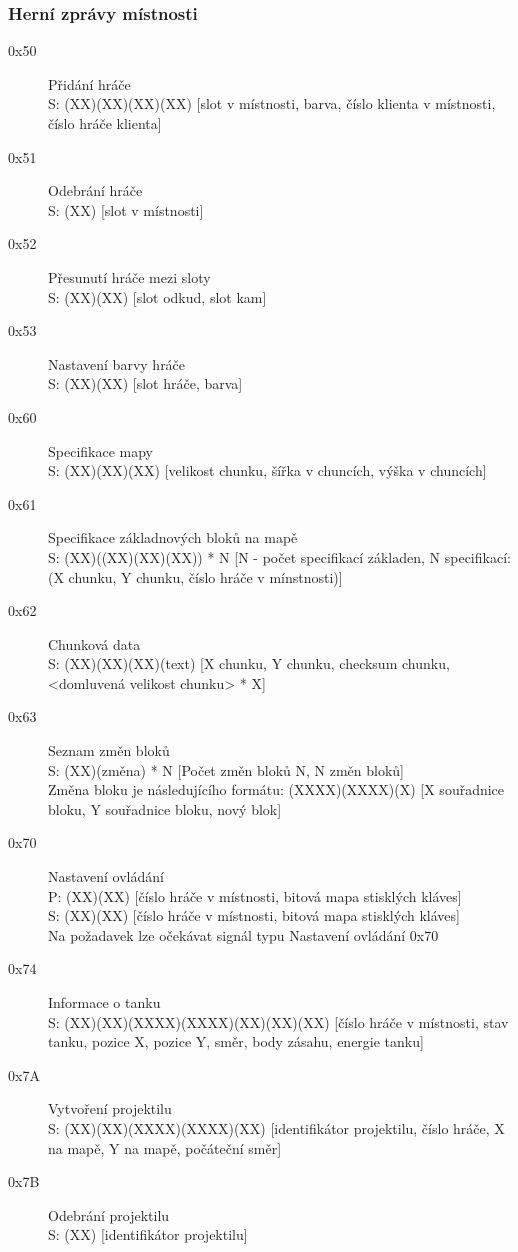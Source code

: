 \documentclass[12pt,a4paper]{article}
\begin{document}
\subsubsection*{Herní zprávy místnosti}
\begin{description}
\item[0x50] Přidání hráče \\
S: (XX)(XX)(XX)(XX) [slot v místnosti, barva, číslo klienta v místnosti, číslo hráče klienta] \\
\item[0x51] Odebrání hráče \\
S: (XX) [slot v místnosti]
\item[0x52] Přesunutí hráče mezi sloty \\
S: (XX)(XX) [slot odkud, slot kam]
\item[0x53] Nastavení barvy hráče \\
S: (XX)(XX) [slot hráče, barva]
\item[0x60] Specifikace mapy \\
S: (XX)(XX)(XX) [velikost chunku, šířka v chuncích, výška v chuncích]
\item[0x61] Specifikace základnových bloků na mapě \\
S: (XX)((XX)(XX)(XX)) * N [N - počet specifikací základen, N specifikací: (X chunku, Y chunku, číslo hráče v mínstnosti)]
\item[0x62] Chunková data \\
S: (XX)(XX)(XX)(text) [X chunku, Y chunku, checksum chunku, <domluvená velikost chunku> * X] \\
\item[0x63] Seznam změn bloků \\
S: (XX)(změna) * N [Počet změn bloků N, N změn bloků]\\ 
Změna bloku je následujícího formátu: (XXXX)(XXXX)(X) [X souřadnice bloku, Y souřadnice bloku, nový blok]
\item[0x70] Nastavení ovládání \\
P: (XX)(XX) [číslo hráče v místnosti, bitová mapa stisklých kláves] \\
S: (XX)(XX) [číslo hráče v místnosti, bitová mapa stisklých kláves] \\
Na požadavek lze očekávat signál typu Nastavení ovládání 0x70
\item[0x74] Informace o tanku \\
S: (XX)(XX)(XXXX)(XXXX)(XX)(XX)(XX) [číslo hráče v místnosti, stav tanku, pozice X, pozice Y, směr, body zásahu, energie tanku] \\
\item[0x7A] Vytvoření projektilu \\
S: (XX)(XX)(XXXX)(XXXX)(XX) [identifikátor projektilu, číslo hráče, X na mapě, Y na mapě, počáteční směr]
\item[0x7B] Odebrání projektilu \\
S: (XX) [identifikátor projektilu]
\end{description}




\end{document}
